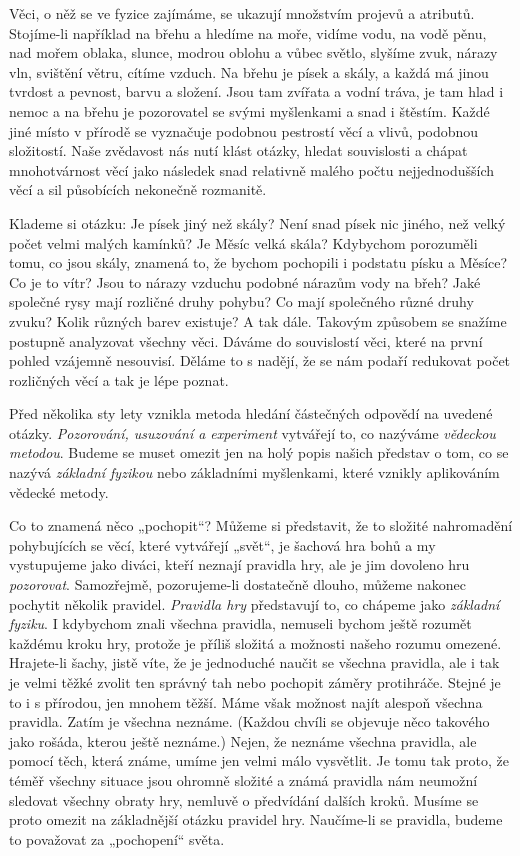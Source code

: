     Věci, o něž se ve fyzice zajímáme, se ukazují množstvím projevů a atributů. Stojíme-li 
    například na břehu a hledíme na moře, vidíme vodu, na vodě pěnu, nad mořem oblaka, slunce, 
    modrou oblohu a vůbec světlo, slyšíme zvuk, nárazy vln, svištění větru, cítíme vzduch. Na břehu 
    je písek a skály, a každá má jinou tvrdost a pevnost, barvu a složení. Jsou tam zvířata a vodní 
    tráva, je tam hlad i nemoc a na břehu je pozorovatel se svými myšlenkami a snad i štěstím. 
    Každé jiné místo v přírodě se vyznačuje podobnou pestrostí věcí a vlivů, podobnou složitostí. 
    Naše zvědavost nás nutí klást otázky, hledat souvislosti a chápat mnohotvárnost věcí jako 
    následek snad relativně malého počtu nejjednodušších věcí a sil působících nekonečně rozmanitě.
    
    Klademe si otázku: Je písek jiný než skály? Není snad písek nic jiného, než velký počet velmi 
    malých kamínků? Je Měsíc velká skála? Kdybychom porozuměli tomu, co jsou skály, znamená to, že 
    bychom pochopili i podstatu písku a Měsíce? Co je to vítr? Jsou to nárazy vzduchu podobné 
    nárazům vody na břeh? Jaké společné rysy mají rozličné druhy pohybu? Co mají společného různé 
    druhy zvuku? Kolik různých barev existuje? A tak dále. Takovým způsobem se snažíme postupně 
    analyzovat všechny věci. Dáváme do souvislostí věci, které na první pohled vzájemně nesouvisí. 
    Děláme to s nadějí, že se nám podaří redukovat počet rozličných věcí a tak je lépe poznat.
    
    Před několika sty lety vznikla metoda hledání částečných odpovědí na uvedené otázky. 
    \emph{Pozorování, usuzování a experiment} vytvářejí to, co nazýváme \emph{vědeckou metodou}. 
    Budeme se muset omezit jen na holý popis našich představ o tom, co se nazývá \emph{základní 
    fyzikou} nebo základními myšlenkami, které vznikly aplikováním vědecké metody.
    
    Co to znamená něco „pochopit“? Můžeme si představit, že to složité nahromadění pohybujících se 
    věcí, které vytvářejí „svět“, je šachová hra bohů a my vystupujeme jako diváci, kteří neznají 
    pravidla hry, ale je jim dovoleno hru \emph{pozorovat}. Samozřejmě, pozorujeme-li dostatečně 
    dlouho, můžeme nakonec pochytit několik pravidel. \emph{Pravidla hry} představují to, co 
    chápeme jako \emph{základní fyziku}. I  kdybychom znali všechna pravidla, nemuseli bychom ještě 
    rozumět každému kroku hry, protože je příliš složitá a možnosti našeho rozumu omezené. 
    Hrajete-li šachy, jistě víte, že je jednoduché naučit se všechna pravidla, ale i tak je velmi 
    těžké zvolit ten správný tah nebo pochopit záměry protihráče. Stejné je to i s přírodou, jen 
    mnohem těžší. Máme však možnost najít alespoň všechna pravidla. Zatím je všechna neznáme. 
    (Každou chvíli se objevuje něco takového jako rošáda, kterou ještě neznáme.) Nejen, že neznáme 
    všechna pravidla, ale pomocí těch, která známe, umíme jen velmi málo vysvětlit. Je tomu tak 
    proto, že téměř všechny situace jsou ohromně složité a známá pravidla nám neumožní sledovat 
    všechny obraty hry, nemluvě o předvídání dalších kroků. Musíme se proto omezit na základnější 
    otázku pravidel hry. Naučíme-li se pravidla, budeme to považovat za „pochopení“ světa.
    
